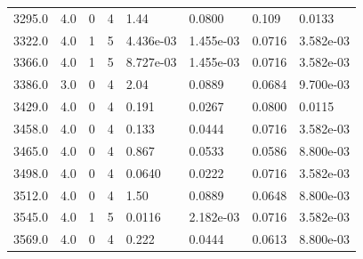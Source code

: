 \documentclass[preview]{standalone}
\begin{document}
{{{\begin{tabular}{L{1.2cm}C{1.2cm} C{0.3cm}C{0.5cm} C{1.4cm}C{1.4cm} C{1.4cm}C{1.4cm}}
  3295.0  &   4.0  & 0     &  4 &  1.44  & 0.0800  & 0.109 &  0.0133   \\ 
  3322.0  &   4.0  & 1     &  5 &  4.436e-03  & 1.455e-03  & 0.0716 &  3.582e-03   \\ 
  3366.0  &   4.0  & 1     &  5 &  8.727e-03  & 1.455e-03  & 0.0716 &  3.582e-03   \\ 
  3386.0  &   3.0  & 0     &  4 &  2.04  & 0.0889  & 0.0684 &  9.700e-03   \\ 
  3429.0  &   4.0  & 0     &  4 &  0.191  & 0.0267  & 0.0800 &  0.0115   \\ 
  3458.0  &   4.0  & 0     &  4 &  0.133  & 0.0444  & 0.0716 &  3.582e-03   \\ 
  3465.0  &   4.0  & 0     &  4 &  0.867  & 0.0533  & 0.0586 &  8.800e-03   \\ 
  3498.0  &   4.0  & 0     &  4 &  0.0640  & 0.0222  & 0.0716 &  3.582e-03   \\ 
  3512.0  &   4.0  & 0     &  4 &  1.50  & 0.0889  & 0.0648 &  8.800e-03   \\ 
  3545.0  &   4.0  & 1     &  5 &  0.0116  & 2.182e-03  & 0.0716 &  3.582e-03   \\ 
  3569.0  &   4.0  & 0     &  4 &  0.222  & 0.0444  & 0.0613 &  8.800e-03   \\ 
\hline 
\end{tabular} 

}}}
\end{document}
